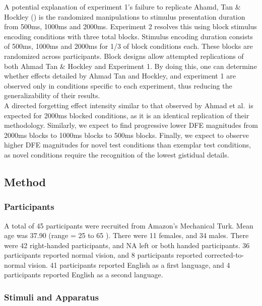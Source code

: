 \documentclass[
  english,
  man,floatsintext]{apa6}
\begin{document}
A potential explanation of experiment 1's failure to replicate Ahamd, Tan \& Hockley () is the randomized manipulations to stimulus presentation duration from 500ms, 1000ms and 2000ms. Experiment 2 resolves this using block stimulus encoding conditions with three total blocks. Stimulus encoding duration consists of 500ms, 1000ms and 2000ms for 1/3 of block conditions each. These blocks are randomized across participants. Block designs allow attempted replications of both Ahmad Tan \& Hockley and Experiment 1. By doing this, one can determine whether effects detailed by Ahmad Tan and Hockley, and experiment 1 are observed only in conditions specific to each experiment, thus reducing the generalizability of their results.\\
A directed forgetting effect intensity similar to that observed by Ahmad et al.~is expected for 2000ms blocked conditions, as it is an identical replication of their methodology. Similarly, we expect to find progressive lower DFE magnitudes from 2000ms blocks to 1000ms blocks to 500ms blocks. Finally, we expect to observe higher DFE magnitudes for novel test conditions than exemplar test conditions, as novel conditions require the recognition of the lowest gistidual details.

\hypertarget{method-1}{%
\subsection{Method}\label{method-1}}

\hypertarget{participants-1}{%
\subsubsection{Participants}\label{participants-1}}

A total of 45 participants were recruited from Amazon's Mechanical Turk. Mean age was 37.90 (range = 25 to 65 ). There were 11 females, and 34 males. There were 42 right-handed participants, and NA left or both handed participants. 36 participants reported normal vision, and 8 participants reported corrected-to-normal vision. 41 participants reported English as a first language, and 4 participants reported English as a second language.

\hypertarget{stimuli-and-apparatus}{%
\subsubsection{Stimuli and Apparatus}\label{stimuli-and-apparatus}}
\end{document}
